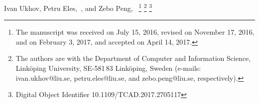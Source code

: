 Ivan Ukhov,
Petru Eles,~, and
Zebo Peng,~
\vspace{-2.5em}
\thanks{
  The manuscript was received on July 15, 2016, revised on November 17, 2016,
  and on February 3, 2017, and accepted on April 14, 2017.
}%
\thanks{
  The authors are with the Department of Computer and Information Science,
  Link\"{o}ping University, SE-581\,83 Link\"{o}ping, Sweden (e-mails:
  ivan.ukhov@liu.se, petru.eles@liu.se, and zebo.peng@liu.se, respectively).
}%
\thanks{
  Digital Object Identifier 10.1109/TCAD.2017.2705117
}%
